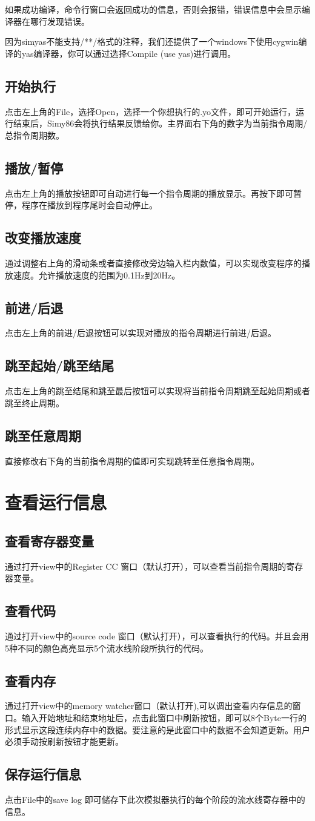\documentclass[a4paper,12pt]{article}
\begin{document}
如果成功编译，命令行窗口会返回成功的信息，否则会报错，错误信息中会显示编译器在哪行发现错误。


因为simyas不能支持/**/格式的注释，我们还提供了一个windows下使用cygwin编译的yas编译器，你可以通过选择Compile (use yas)进行调用。
\subsection{开始执行}
点击左上角的File，选择Open，选择一个你想执行的.yo文件，即可开始运行，运行结束后，Simy86会将执行结果反馈给你。主界面右下角的数字为当前指令周期/总指令周期数。
\subsection{播放/暂停}
点击左上角的播放按钮即可自动进行每一个指令周期的播放显示。再按下即可暂停，程序在播放到程序尾时会自动停止。
\subsection{改变播放速度}
通过调整右上角的滑动条或者直接修改旁边输入栏内数值，可以实现改变程序的播放速度。允许播放速度的范围为0.1Hz到20Hz。
\subsection{前进/后退}
点击左上角的前进/后退按钮可以实现对播放的指令周期进行前进/后退。
\subsection{跳至起始/跳至结尾}
点击左上角的跳至结尾和跳至最后按钮可以实现将当前指令周期跳至起始周期或者跳至终止周期。
\subsection{跳至任意周期}
直接修改右下角的当前指令周期的值即可实现跳转至任意指令周期。


\newpage
\section{查看运行信息}
\subsection{查看寄存器变量}
通过打开view中的Register CC 窗口（默认打开），可以查看当前指令周期的寄存器变量。
\subsection{查看代码}
通过打开view中的source code 窗口（默认打开），可以查看执行的代码。并且会用5种不同的颜色高亮显示5个流水线阶段所执行的代码。
\subsection{查看内存}
通过打开view中的memory watcher窗口（默认打开),可以调出查看内存信息的窗口。输入开始地址和结束地址后，点击此窗口中刷新按钮，即可以8个Byte一行的形式显示这段连续内存中的数据。要注意的是此窗口中的数据不会知道更新。用户必须手动按刷新按钮才能更新。
\subsection{保存运行信息}
点击File中的save log 即可储存下此次模拟器执行的每个阶段的流水线寄存器中的信息。
\end{document}
